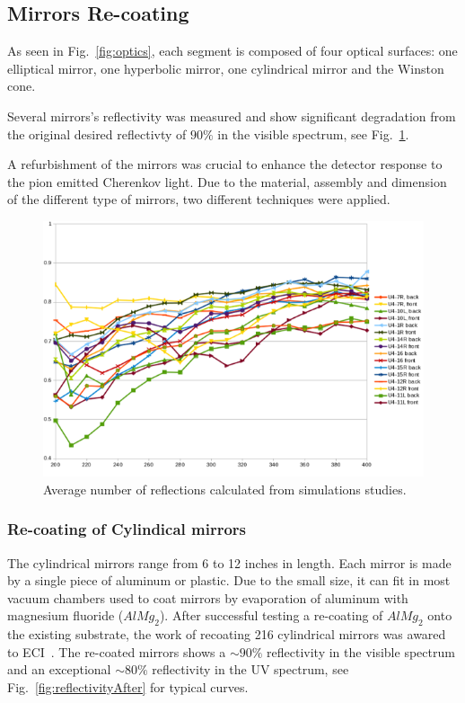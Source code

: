 \subsection{Mirrors Re-coating}

As seen in Fig.~\ref{fig:optics}, each segment is composed of four optical surfaces: one elliptical mirror,
one hyperbolic mirror, one cylindrical mirror and the Winston cone.

Several mirrors's reflectivity was measured and show significant degradation from the original
desired reflectivty of $90\%$ in the visible spectrum, see Fig.~\ref{fig:reflectivityBefore}.

A refurbishment of the mirrors was crucial to enhance the detector response to the pion emitted Cherenkov light.
Due to the material, assembly and dimension of the different type of mirrors, two different techniques were applied.

\begin{figure}[h]
\centering
	\includegraphics[width=1.0\columnwidth,keepaspectratio]{img/mirrorsReflectivityBefore.png}
	\caption{Average number of reflections calculated from simulations studies.}
	\label{fig:reflectivityBefore}
\end{figure}


\subsubsection{Re-coating of Cylindical mirrors}

The cylindrical mirrors range from 6 to 12 inches in length. Each mirror is made by a single piece of aluminum or plastic.
Due to the small size, it can fit in most vacuum chambers used to coat mirrors by evaporation of aluminum with magnesium fluoride
($AlMg_2$). After successful testing a re-coating of $AlMg_2$ onto the existing substrate, the work of recoating 216 cylindrical mirrors
was awared to ECI~\cite{ECI}. The re-coated mirrors shows a $\sim 90\%$ reflectivity in the visible spectrum and an exceptional $\sim 80\%$
reflectivity in the UV spectrum, see Fig.~\ref{fig:reflectivityAfter} for typical curves.


